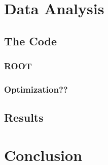\documentclass[11pt,a4paper]{article}
\begin{document}
\section{Data Analysis}

\subsection{The Code}

\subsubsection{ROOT}

\subsubsection{Optimization??}

\subsection{Results}

\section{Conclusion}
\end{document}
